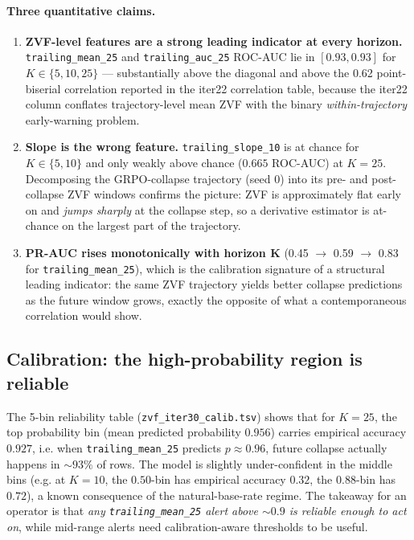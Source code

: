 \documentclass{article}
\begin{document}
\paragraph{Three quantitative claims.}
\begin{enumerate}
\item \textbf{ZVF-level features are a strong leading indicator at every horizon.}
\texttt{trailing\_mean\_25} and \texttt{trailing\_auc\_25} ROC-AUC lie in
$[0.93, 0.93]$ for $K \in \{5, 10, 25\}$ — substantially above the diagonal
and above the 0.62 point-biserial correlation reported in the iter22
correlation table, because the iter22 column conflates trajectory-level mean
ZVF with the binary \emph{within-trajectory} early-warning problem.
\item \textbf{Slope is the wrong feature.} \texttt{trailing\_slope\_10} is at
chance for $K \in \{5, 10\}$ and only weakly above chance ($0.665$ ROC-AUC)
at $K{=}25$. Decomposing the GRPO-collapse trajectory (seed 0) into its
pre- and post-collapse ZVF windows confirms the picture: ZVF is approximately
flat early on and \emph{jumps sharply} at the collapse step, so a derivative
estimator is at-chance on the largest part of the trajectory.
\item \textbf{PR-AUC rises monotonically with horizon K} (0.45 $\to$ 0.59
$\to$ 0.83 for \texttt{trailing\_mean\_25}), which is the calibration
signature of a structural leading indicator: the same ZVF trajectory yields
better collapse predictions as the future window grows, exactly the opposite
of what a contemporaneous correlation would show.
\end{enumerate}

\subsection{Calibration: the high-probability region is reliable}
\label{sec:zvf-iter30-calib}

The 5-bin reliability table (\texttt{zvf\_iter30\_calib.tsv}) shows that
for $K{=}25$, the top probability bin (mean predicted probability
$0.956$) carries empirical accuracy $0.927$, i.e. when \texttt{trailing\_mean\_25}
predicts $p\!\approx\!0.96$, future collapse actually happens in $\sim\!93\%$
of rows. The model is slightly under-confident in the middle bins (e.g. at
$K{=}10$, the $0.50$-bin has empirical accuracy $0.32$, the $0.88$-bin has
$0.72$), a known consequence of the natural-base-rate regime. The takeaway
for an operator is that \emph{any \texttt{trailing\_mean\_25} alert above
$\sim\!0.9$ is reliable enough to act on}, while mid-range alerts need
calibration-aware thresholds to be useful.
\end{document}
